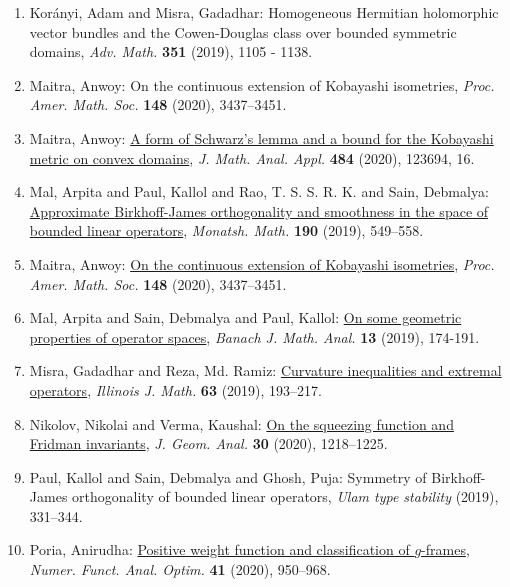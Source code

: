 \begin{enumerate}[resume, leftmargin=27pt]
	\item Kor\'{a}nyi, Adam and Misra, Gadadhar: Homogeneous Hermitian holomorphic vector bundles and the Cowen-Douglas class over bounded symmetric domains, \emph{Adv. Math.} {\bf 351} (2019), 1105 - 1138.

	\item Maitra, Anwoy: On the continuous extension of Kobayashi isometries, \emph{Proc. Amer. Math. Soc.} {\bf 148} (2020), 3437--3451.

	\item Maitra, Anwoy: \href{https://doi.org/10.1016/j.jmaa.2019.123694}{A form of {S}chwarz's lemma and a bound for the {K}obayashi
		      metric on convex domains}, \emph{J. Math. Anal. Appl.} {\bf 484} (2020), 123694, 16.
	\item Mal, Arpita and Paul, Kallol and Rao, T. S. S. R. K. and Sain,
	      Debmalya: \href{https://doi.org/10.1007/s00605-019-01289-3}{Approximate {B}irkhoff-{J}ames orthogonality and smoothness in
	      the space of bounded linear operators}, \emph{Monatsh. Math.} {\bf 190} (2019), 549--558.

	\item Maitra, Anwoy: \href{https://doi.org/10.1090/proc/15038}{On the continuous extension of {K}obayashi isometries}, \emph{Proc. Amer. Math. Soc.} {\bf 148} (2020), 3437--3451.

	\item Mal, Arpita and Sain, Debmalya and Paul, Kallol: \href{https://projecteuclid.org/euclid.bjma/1543914019}{On some geometric properties of operator spaces}, \emph{Banach J. Math. Anal.} {\bf 13} (2019), 174-191.

	\item Misra, Gadadhar and Reza, Md. Ramiz: \href{https://doi.org/10.1215/00192082-7768711}{Curvature inequalities and extremal operators}, \emph{Illinois J. Math.} {\bf 63} (2019), 193--217.

	\item Nikolov, Nikolai and Verma, Kaushal: \href{https://doi.org/10.1007/s12220-019-00237-9}{On the squeezing function and {F}ridman invariants}, \emph{J. Geom. Anal.} {\bf 30} (2020), 1218--1225.

	\item Paul, Kallol and Sain, Debmalya and Ghosh, Puja: Symmetry of {B}irkhoff-{J}ames orthogonality of bounded linear
	      operators, \emph{Ulam type stability} {\bf } (2019), 331--344.

	\item Poria, Anirudha: \href{https://doi.org/10.1080/01630563.2020.1728771}{Positive weight function and classification of {$g$}-frames}, \emph{Numer. Funct. Anal. Optim.} {\bf 41} (2020), 950--968.


\end{enumerate}
